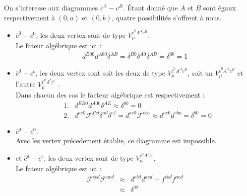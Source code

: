 \documentclass[a4paper,11pt]{article}
\theoremstyle{plain}
\theoremstyle{definition}
\theoremstyle{remark}
\numberwithin{equation}{section}
\numberwithin{equation}{subsection}
\numberwithin{figure}{section}
\begin{document}
\noindent
On s'interesse aux diagrammes $\overline{c}^{A}  -  c^{B}$. Étant donné que $A$ et $B$ sont égaux respectivement à $(0,a)$ et $(0,b)$, quatre possibilités s'offrent à nous.
 \begin{itemize}
 \renewcommand{\labelitemi}{$\checkmark$}

 \item $\overline{c}^{0}  -  c^{0}$, les deux vertex sont de type  $V_{\mu}^{ \overline{c}^{0} A^{A} c^{B} }$. \\
Le fateur algébrique est ici :
\begin{eqnarray}
 d^{B00} d^{A00} \delta^{AB} = \delta^{B0}  \delta^{A0}  \delta^{AB} =  \delta^{00}  =  1
\end{eqnarray}

 \item $\overline{c}^{0}  -  c^{b}$, les deux vertex sont soit les deux de type $V_{\mu}^{ \overline{c}^{0} A^{A} c^{B} }$, soit un $V_{\mu}^{ \overline{c}^{0} A^{A} c^{B} }$ et l'autre $V_{\mu}^{ \overline{c}^{a} A^{b} c^{c} }$ . \\ 
Dans chacun des cas le facteur algébrique est respectivement :
\begin{eqnarray}
 &1.&  d^{EB0} d^{A00} \delta^{AE} \approx \delta^{0b}  = 0  \\
 &2.&  d^{ae0} \mathcal{F}^{fbd} \delta^{ad} \delta^{ef} = d^{ae0} \mathcal{F}^{eba}  \approx d^{ae0} d^{eba} = \delta^{b0}  =  0
\end{eqnarray}


 \item $\overline{c}^{a}  -  c^{0}$. \\
Avec les vertex précedement établie, ce diagramme est impossible.

 \item et $\overline{c}^{a}  -  c^{b}$, les deux vertex sont de type  $V_{\mu}^{ \overline{c}^{a} A^{b} c^{c} }$. \\
Le fateur algébrique est ici :
\begin{eqnarray}
 \mathcal{F}^{ebd} \mathcal{F}^{aed} &\approx& d^{ebd} d^{aed} + f^{ebd} f^{aed} \\
                                                                   &\approx& \delta^{ab}
\end{eqnarray}

\end{itemize} 
\end{document}

